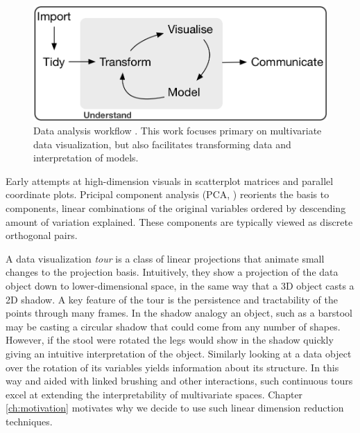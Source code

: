 \documentclass{template/monashthesis}
\begin{document}
\begin{figure}

{\centering \includegraphics[width=1\linewidth,]{./figures/data_analysis_workflow} 

}

\caption{Data analysis workflow \autocite{wickham_r_2017}. This work focuses primary on multivariate data visualization, but also facilitates transforming data and interpretation of models.}\label{fig:dataanalysisworkflow}
\end{figure}

Early attempts at high-dimension visuals in scatterplot matrices \autocite{chambers_graphical_1983} and parallel coordinate plots\autocite{ocagne_coordonnees_1885}. Pricipal component analysis (PCA, \textcite{pearson_liii._1901}) reorients the basis to components, linear combinations of the original variables ordered by descending amount of variation explained. These components are typically viewed as discrete orthogonal pairs.

A data visualization \emph{tour} \autocite{cook_grand_2008,lee_review_2021} is a class of linear projections that animate small changes to the projection basis. Intuitively, they show a projection of the data object down to lower-dimensional space, in the same way that a 3D object casts a 2D shadow. A key feature of the tour is the persistence and tractability of the points through many frames. In the shadow analogy an object, such as a barstool may be casting a circular shadow that could come from any number of shapes. However, if the stool were rotated the legs would show in the shadow quickly giving an intuitive interpretation of the object. Similarly looking at a data object over the rotation of its variables yields information about its structure. In this way and aided with linked brushing and other interactions, such continuous tours excel at extending the interpretability of multivariate spaces. Chapter \ref{ch:motivation} motivates why we decide to use such linear dimension reduction techniques.
\end{document}
